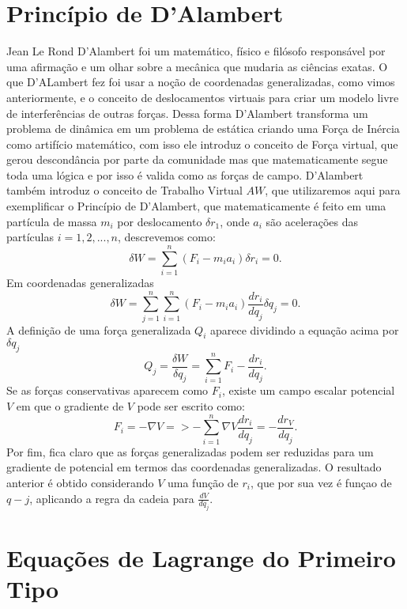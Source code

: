 \documentclass{article}
\begin{document}
\section{Princípio de D'Alambert}
Jean Le Rond D'Alambert foi um matemático, físico e filósofo responsável por uma afirmação e um olhar sobre a mecânica que mudaria as ciências exatas. O que D'ALambert fez foi usar a noção de coordenadas generalizadas, como vimos anteriormente, e o conceito de deslocamentos virtuais para criar um modelo livre de interferências de outras forças. Dessa forma D'Alambert transforma um problema de dinâmica em um problema de estática criando uma Força de Inércia como artifício matemático, com isso ele introduz o conceito de Força virtual, que gerou descondância por parte da comunidade mas que matematicamente segue toda uma lógica e por isso é valida como as forças de campo. D'Alambert também introduz o conceito de Trabalho Virtual ${AW}$, que utilizaremos aqui para exemplificar o Princípio de D'Alambert, que matematicamente é feito em uma partícula de massa ${m_i}$ por deslocamento ${ \delta r_1}$, onde $a_i$ são acelerações das partículas $i=1, 2,...,n$, descrevemos como:
\begin{equation}
    \delta W = \sum_{i=1}^n (F_i - m_ia_i)\delta r_i = 0.
\end{equation}
Em coordenadas generalizadas
\begin{equation}
    \delta W = \sum_{j=1}^n\sum_{i=1}^n (F_i - m_ia_i)\frac{dr_i}{dq_j}\delta q_j = 0.
\end{equation}
A definição de uma força generalizada $Q_i$ aparece dividindo a equação acima por ${ \delta q_j}$
\begin{equation}
    Q_j = \frac{\delta W}{\delta q_j} = \sum_{i=1}^n F_i -\frac{dr_i}{dq_j}.
\end{equation}
Se as forças conservativas aparecem como $F_i$, existe um campo escalar potencial $V$ em que o gradiente de $V$ pode ser escrito como:
\begin{equation}
    F_i = - \nabla V =>  -\sum_{i=1}^n \nabla V \frac{dr_i}{dq_j} = - \frac{dr_V}{dq_j} .
\end{equation}
Por fim, fica claro que as forças generalizadas podem ser reduzidas para um gradiente de potencial em termos das coordenadas generalizadas. O resultado anterior é obtido considerando $V$ uma função de $r_i$, que por sua vez é funçao de $q-j$, aplicando a regra da cadeia para $\frac{dV}{dq_j}$.
\section{Equações de Lagrange do Primeiro Tipo}
\end{document}
